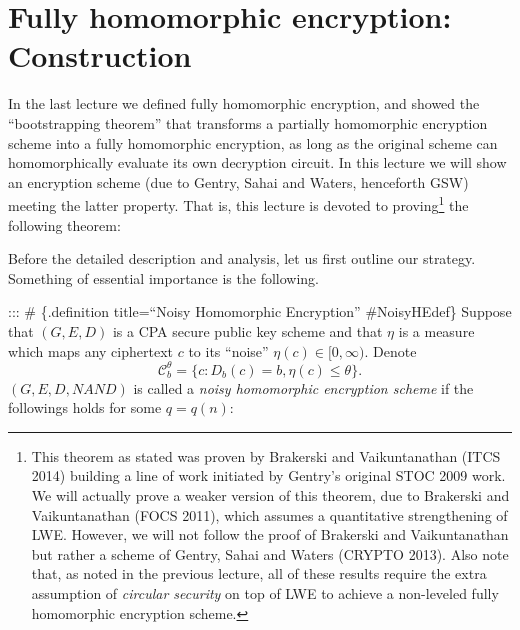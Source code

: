 \chapter{Fully homomorphic encryption: Construction}\label{chapfhetwo}

In the last lecture we defined fully homomorphic encryption, and showed
the ``bootstrapping theorem'' that transforms a partially homomorphic
encryption scheme into a fully homomorphic encryption, as long as the
original scheme can homomorphically evaluate its own decryption circuit.
In this lecture we will show an encryption scheme (due to Gentry, Sahai
and Waters, henceforth GSW) meeting the latter property. That is, this
lecture is devoted to proving\footnote{This theorem as stated was proven
  by Brakerski and Vaikuntanathan (ITCS 2014) building a line of work
  initiated by Gentry's original STOC 2009 work. We will actually prove
  a weaker version of this theorem, due to Brakerski and Vaikuntanathan
  (FOCS 2011), which assumes a quantitative strengthening of LWE.
  However, we will not follow the proof of Brakerski and Vaikuntanathan
  but rather a scheme of Gentry, Sahai and Waters (CRYPTO 2013). Also
  note that, as noted in the previous lecture, all of these results
  require the extra assumption of \emph{circular security} on top of LWE
  to achieve a non-leveled fully homomorphic encryption scheme.} the
following theorem:

\hypertarget{LWEFHEthm}{}

Before the detailed description and analysis, let us first outline our
strategy. Something of essential importance is the following.

::: \# \{.definition title=``Noisy Homomorphic Encryption''
\#NoisyHEdef\} Suppose that \((G,E,D)\) is a CPA secure public key
scheme and that \(\eta\) is a measure which maps any ciphertext \(c\) to
its ``noise'' \(\eta(c)\in [0, \infty).\) Denote
\begin{equation*}
\mathcal{C}_b^\theta=\{c:D_b(c)=b,\eta(c)\leq\theta \}.
\end{equation*}
\((G,E,D,\ensuremath{\mathit{NAND}})\) is called a \emph{noisy
homomorphic encryption scheme} if the followings holds for some
\(q=q(n)\):


